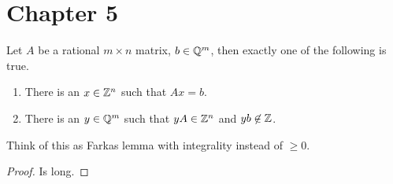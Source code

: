 \documentclass{exam}
\begin{document}
    \section{Chapter 5}
    \begin{theorem}
        Let $A$ be a rational $m \times n$ matrix, $b \in \mathbb{Q}^m$, then exactly one of the following is true.
        \begin{enumerate}
            \item There is an $x \in \mathbb{Z}^n$ such that $Ax=b$.
            \item There is an $y \in \mathbb{Q}^m$ such that $yA \in \mathbb{Z}^n$ and $yb \not \in \mathbb{Z}$.
        \end{enumerate}
    \end{theorem}
    Think of this as Farkas lemma with integrality instead of $\ge 0$.
    \begin{proof}
        Is long. %
    \end{proof}
\end{document}
